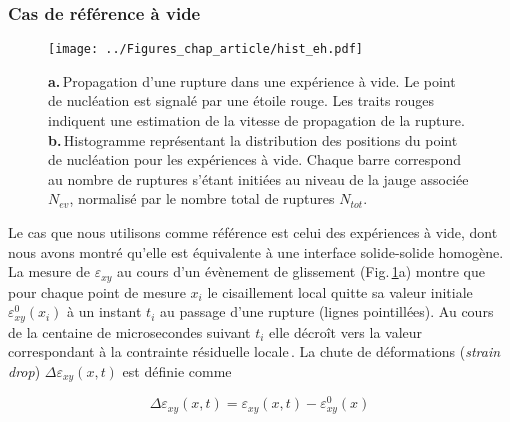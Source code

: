 \subsubsection{Cas de référence à vide}

\begin{figure}[htb]
\centering
\texttt{[image: ../Figures\_chap\_article/hist\_eh.pdf]}
\caption[Nucléation et propagation -- expérience à vide]{\textbf{a.}\,Propagation d'une rupture dans une expérience à vide. Le point de nucléation est signalé par une étoile rouge. Les traits rouges indiquent une estimation de la vitesse de propagation de la rupture. \textbf{b.}\,Histogramme représentant la distribution des positions du point de nucléation pour les expériences à vide. Chaque barre correspond au nombre de ruptures s'étant initiées au niveau de la jauge associée $N_{ev}$, normalisé par le nombre total de ruptures $N_{tot}$.}
\label{fig:propagss}
\end{figure}


Le cas que nous utilisons comme référence est celui des expériences à vide, dont nous avons montré qu'elle est équivalente à une interface solide-solide homogène. La mesure de $\varepsilon_{xy}$ au cours d'un évènement de glissement (Fig.\,\ref{fig:propagss}a) montre que pour chaque point de mesure $x_i$ le cisaillement local quitte sa valeur initiale $\varepsilon_{xy}^0(x_i)$ à un instant $t_i$ au passage d'une rupture (lignes pointillées).
Au cours de la centaine de microsecondes suivant $t_i$ elle décroît vers la valeur correspondant à la contrainte résiduelle locale\,\cite{freund_dynamic_1990,svetlizky_brittle_2019}.
La chute de déformations (\textit{strain drop}) $\Delta\varepsilon_{xy}(x,t)$ est définie comme

\begin{equation}
\Delta\varepsilon_{xy}(x,t)=\varepsilon_{xy}(x,t)-\varepsilon_{xy}^0(x)
\end{equation}

